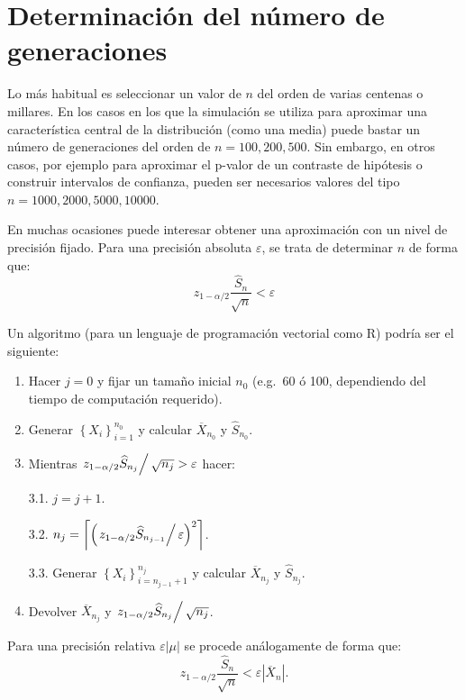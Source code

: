 \documentclass[
  spanish,
  10pt,
]{book}
\theoremstyle{break}
\theoremstyle{nonumberplain}
\begin{document}
\section{Determinación del número de generaciones}\label{num-gen}

Lo más habitual es seleccionar un valor de \(n\) del orden de varias centenas o millares.
En los casos en los que la simulación se utiliza para aproximar una característica central de la distribución (como una media) puede bastar un número de generaciones del orden de \(n = 100, 200, 500\).
Sin embargo, en otros casos, por ejemplo para aproximar el p-valor de un contraste de hipótesis o construir intervalos de confianza, pueden ser necesarios valores del tipo \(n = 1000, 2000, 5000, 10000\).

En muchas ocasiones puede interesar obtener una aproximación con un nivel de precisión fijado.
Para una precisión absoluta \(\varepsilon\), se trata de determinar
\(n\) de forma que:
\[z_{1-\alpha /2}\dfrac{\widehat{S}_{n}}{\sqrt{n}}<\varepsilon\]

Un algoritmo (para un lenguaje de programación vectorial como R) podría ser el siguiente:

\begin{enumerate}
\def\labelenumi{\arabic{enumi}.}
\item
  Hacer \(j=0\)
  y fijar un tamaño inicial \(n_{0}\) (e.g.~60 ó 100, dependiendo del tiempo de computación requerido).
\item
  Generar \(\left\{ X_{i}\right\} _{i=1}^{n_{0}}\)
  y calcular \(\overline{X}_{n_0}\) y \(\widehat{S}_{n_{0}}\).
\item
  Mientras \(\left. z_{1-\alpha /2}\widehat{S}_{n_j}\right/ \sqrt{n_{j}}>\varepsilon\) hacer:

  3.1. \(j=j+1\).

  3.2. \(n_{j}=\left\lceil \left( \left. z_{1-\alpha /2}\widehat{S}
       _{n_{j-1}}\right/ \varepsilon \right)^{2}\right\rceil\).

  3.3. Generar \(\left\{ X_{i}\right\}_{i=n_{j-1}+1}^{n_j}\)
  y calcular \(\overline{X}_{n_j}\) y \(\widehat{S}_{n_j}\).
\item
  Devolver \(\overline{X}_{n_j}\) y \(\left. z_{1-\alpha /2}\widehat{S}_{n_j}\right/ \sqrt{n_{j}}\).
\end{enumerate}

Para una precisión relativa \(\varepsilon \left\vert \mu \right\vert\) se procede análogamente de forma que:
\[z_{1-\alpha /2}\dfrac{\widehat{S}_{n}}{\sqrt{n}}<\varepsilon \left\vert 
\overline{X}_{n}\right\vert .\]
\end{document}
